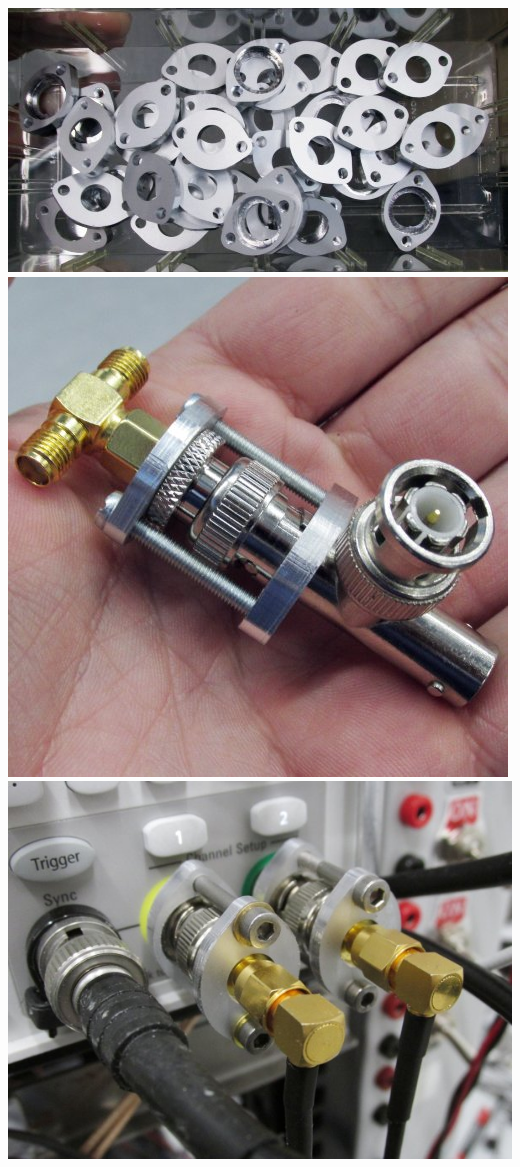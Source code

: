 \documentclass[a4paper]{article}
\begin{document}
\begin{center}
\includegraphics[width=\linewidth]{img/clamp1.jpg}
\includegraphics[width=\linewidth]{img/clamp2.jpg}
\includegraphics[width=\linewidth]{img/clamp3.jpg}
\end{center}
\end{document}
